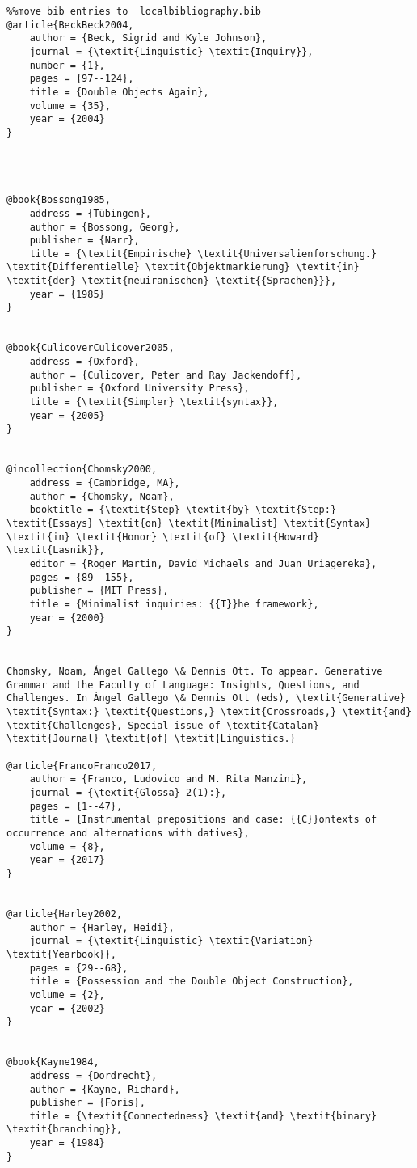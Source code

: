 \documentclass[output=paper]{langscibook}
\begin{document}
\begin{verbatim}%%move bib entries to  localbibliography.bib
@article{BeckBeck2004,
	author = {Beck, Sigrid and Kyle Johnson},
	journal = {\textit{Linguistic} \textit{Inquiry}},
	number = {1},
	pages = {97--124},
	title = {Double Objects Again},
	volume = {35},
	year = {2004}
}




@book{Bossong1985,
	address = {Tübingen},
	author = {Bossong, Georg},
	publisher = {Narr},
	title = {\textit{Empirische} \textit{Universalienforschung.} \textit{Differentielle} \textit{Objektmarkierung} \textit{in} \textit{der} \textit{neuiranischen} \textit{{Sprachen}}},
	year = {1985}
}


@book{CulicoverCulicover2005,
	address = {Oxford},
	author = {Culicover, Peter and Ray Jackendoff},
	publisher = {Oxford University Press},
	title = {\textit{Simpler} \textit{syntax}},
	year = {2005}
}


@incollection{Chomsky2000,
	address = {Cambridge, MA},
	author = {Chomsky, Noam},
	booktitle = {\textit{Step} \textit{by} \textit{Step:} \textit{Essays} \textit{on} \textit{Minimalist} \textit{Syntax} \textit{in} \textit{Honor} \textit{of} \textit{Howard} \textit{Lasnik}},
	editor = {Roger Martin, David Michaels and Juan Uriagereka},
	pages = {89--155},
	publisher = {MIT Press},
	title = {Minimalist inquiries: {{T}}he framework},
	year = {2000}
}


Chomsky, Noam, Ángel Gallego \& Dennis Ott. To appear. Generative Grammar and the Faculty of Language: Insights, Questions, and Challenges. In Ángel Gallego \& Dennis Ott (eds), \textit{Generative} \textit{Syntax:} \textit{Questions,} \textit{Crossroads,} \textit{and} \textit{Challenges}, Special issue of \textit{Catalan} \textit{Journal} \textit{of} \textit{Linguistics.}

@article{FrancoFranco2017,
	author = {Franco, Ludovico and M. Rita Manzini},
	journal = {\textit{Glossa} 2(1):},
	pages = {1--47},
	title = {Instrumental prepositions and case: {{C}}ontexts of occurrence and alternations with datives},
	volume = {8},
	year = {2017}
}


@article{Harley2002,
	author = {Harley, Heidi},
	journal = {\textit{Linguistic} \textit{Variation} \textit{Yearbook}},
	pages = {29--68},
	title = {Possession and the Double Object Construction},
	volume = {2},
	year = {2002}
}


@book{Kayne1984,
	address = {Dordrecht},
	author = {Kayne, Richard},
	publisher = {Foris},
	title = {\textit{Connectedness} \textit{and} \textit{binary} \textit{branching}},
	year = {1984}
}



\end{verbatim}
\end{document}
